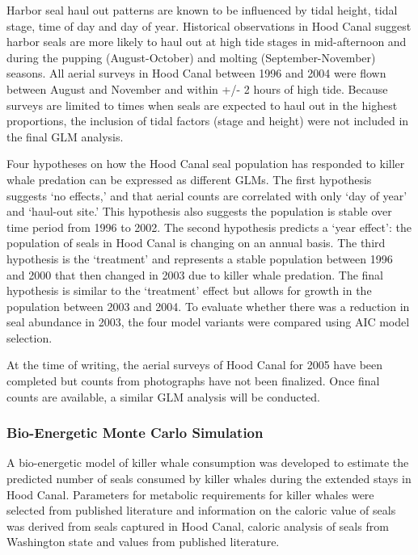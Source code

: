 Harbor seal haul out patterns are known to be influenced by tidal
height, tidal stage, time of day and day of year. Historical
observations in Hood Canal suggest harbor seals are more likely to haul
out at high tide stages in mid-afternoon and during the pupping
(August-October) and molting (September-November) seasons. All aerial
surveys in Hood Canal between 1996 and 2004 were flown between August
and November and within +/- 2 hours of high tide. Because surveys are
limited to times when seals are expected to haul out in the highest
proportions, the inclusion of tidal factors (stage and height) were not
included in the final GLM analysis.

Four hypotheses on how the Hood Canal seal population has responded to
killer whale predation can be expressed as different GLMs. The first
hypothesis suggests `no effects,' and that aerial counts are correlated
with only `day of year' and `haul-out site.' This hypothesis also
suggests the population is stable over time period from 1996 to 2002.
The second hypothesis predicts a `year effect': the population of seals
in Hood Canal is changing on an annual basis. The third hypothesis is
the `treatment' and represents a stable population between 1996 and 2000
that then changed in 2003 due to killer whale predation. The final
hypothesis is similar to the `treatment' effect but allows for growth in
the population between 2003 and 2004. To evaluate whether there was a
reduction in seal abundance in 2003, the four model variants were
compared using AIC model selection.

At the time of writing, the aerial surveys of Hood Canal for 2005 have
been completed but counts from photographs have not been finalized. Once
final counts are available, a similar GLM analysis will be conducted.

\subsubsection{Bio-Energetic Monte Carlo
Simulation}\label{bio-energetic-monte-carlo-simulation}

A bio-energetic model of killer whale consumption was developed to
estimate the predicted number of seals consumed by killer whales during
the extended stays in Hood Canal. Parameters for metabolic requirements
for killer whales were selected from published literature and
information on the caloric value of seals was derived from seals
captured in Hood Canal, caloric analysis of seals from Washington state
and values from published literature.

